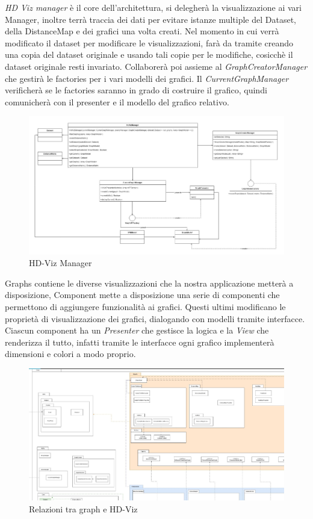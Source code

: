 \documentclass[../manuale_sviluppatore.tex]{subfiles}
\begin{document}
\emph{HD Viz manager} è il core dell'architettura, si delegherà la visualizzazione ai vari Manager, inoltre terrà traccia 
dei dati per evitare istanze multiple del Dataset, della DistanceMap e dei grafici una volta creati. Nel momento in cui 
verrà modificato il dataset per modificare le visualizzazioni, farà da tramite creando una copia del dataset originale e usando
tali copie per le modifiche, cosicchè il dataset originale resti invariato.
Collaborerà poi assieme al \emph{GraphCreatorManager} che gestirà le factories per i vari modelli dei grafici. 
Il \emph{CurrentGraphManager} verificherà se le factories saranno in grado di costruire il grafico, quindi comunicherà con il 
presenter e il modello del grafico relativo. \\


\begin{figure}[H]
	\centering
	\includegraphics[width=18cm]{img/core-hdvizmanager.jpg}
	\caption{HD-Viz Manager}
\end{figure}

Graphs contiene le diverse visualizzazioni che la nostra applicazione metterà a disposizione, Component mette a disposizione una serie di componenti che permettono di aggiungere funzionalità ai grafici.
Questi ultimi modificano le proprietà di visualizzazione dei grafici, dialogando con modelli tramite interfacce. Ciascun component ha un \emph{Presenter} che gestisce la logica e la \emph{View} che renderizza il tutto,
infatti tramite le interfacce ogni grafico implementerà dimensioni e colori a modo proprio.

\begin{figure}[H]
	\centering
	\includegraphics[width=18cm]{img/graph-e-hdviz.jpg}
	\caption{Relazioni tra graph e HD-Viz}
\end{figure}
\end{document}
